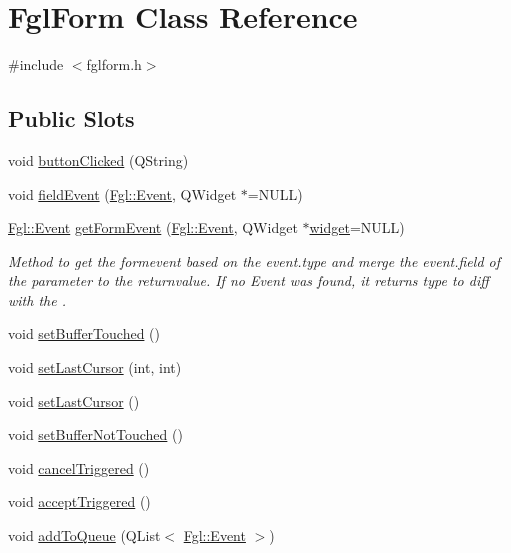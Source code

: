 \hypertarget{classFglForm}{
\section{FglForm Class Reference}
\label{classFglForm}
}


{\ttfamily \#include $<$fglform.h$>$}

\subsection*{Public Slots}
\begin{DoxyCompactItemize}
\item 
void \hyperlink{classFglForm_a0ee0e2722721bf18a2809e670e0777cf}{buttonClicked} (QString)
\item 
void \hyperlink{classFglForm_a1fd5cabc8ec447738e4420f618d69ca7}{fieldEvent} (\hyperlink{structFgl_1_1Event}{Fgl::Event}, QWidget $\ast$=NULL)
\item 
\hyperlink{structFgl_1_1Event}{Fgl::Event} \hyperlink{classFglForm_a8ce69fa40e651b0238b3efbe64bb7ef7}{getFormEvent} (\hyperlink{structFgl_1_1Event}{Fgl::Event}, QWidget $\ast$\hyperlink{classFglForm_a15cd139d56b40da6de43a6bb4d438c0d}{widget}=NULL)
\begin{DoxyCompactList}\small\item\em Method to get the formevent based on the event.type and merge the event.field of the parameter to the returnvalue. If no Event was found, it returns type to diff with the . \item\end{DoxyCompactList}\item 
void \hyperlink{classFglForm_a763db4c754333829447f9766c25f0e0b}{setBufferTouched} ()
\item 
void \hyperlink{classFglForm_a8495f6c9444756a6bdf370c3ce158921}{setLastCursor} (int, int)
\item 
void \hyperlink{classFglForm_ab61a1af085f68fa6673e516812b0b9c8}{setLastCursor} ()
\item 
void \hyperlink{classFglForm_a7146bdb938bcb9a88b23051b39ea19b7}{setBufferNotTouched} ()
\item 
void \hyperlink{classFglForm_a21cf637edb3ad010d7e00e4d20b95825}{cancelTriggered} ()
\item 
void \hyperlink{classFglForm_afd623938967b4f76707704ab67032a57}{acceptTriggered} ()
\item 
void \hyperlink{classFglForm_a21e6b7f851487d6d0db29b015a37e374}{addToQueue} (QList$<$ \hyperlink{structFgl_1_1Event}{Fgl::Event} $>$)

\end{DoxyCompactItemize}
